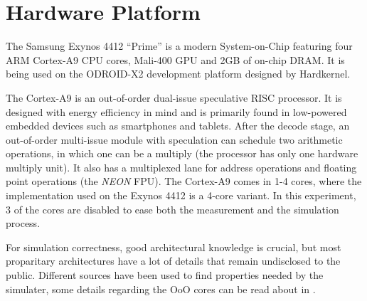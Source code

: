 \section{Hardware Platform}

The Samsung Exynos 4412 ``Prime'' is a modern System-on-Chip featuring four ARM
Cortex-A9 CPU cores, Mali-400 GPU and 2GB of on-chip DRAM. It is being used on
the ODROID-X2 development platform designed by Hardkernel.

The Cortex-A9 is an out-of-order dual-issue speculative RISC processor. It is
designed with energy efficiency in mind and is primarily found in low-powered
embedded devices such as smartphones and tablets. After the decode stage, an
out-of-order multi-issue module with speculation can schedule two arithmetic
operations, in which one can be a multiply (the processor has only one hardware
multiply unit). It also has a multiplexed lane for address operations and
floating point operations (the \emph{NEON} FPU). The Cortex-A9 comes in 1-4 cores,
where the implementation used on the Exynos 4412 is a 4-core variant. In this
experiment, 3 of the cores are disabled to ease both the measurement and the
simulation process.

For simulation correctness, good architectural knowledge is crucial, but most
proparitary architectures have a lot of details that remain undisclosed to the
public. Different sources have been used to find properties needed by the simulater,
some details regarding the OoO cores can be read about in \cite{blem2013detailed}.
